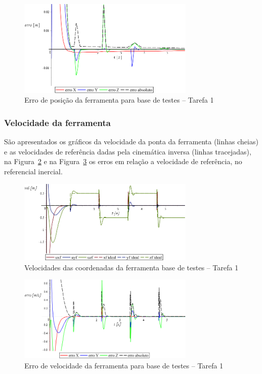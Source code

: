 \begin{figure}[h!]
	\centering 
 	\includegraphics[width=0.75\textwidth]{figs/t1_erroposf_base_testes}
 	\caption{Erro de posição da ferramenta para base de testes -- Tarefa 1}
 	\label{fig::t1_erroposf_base_testes}
\end{figure}



\subsubsection{Velocidade da ferramenta}

São apresentados os gráficos da velocidade da ponta da ferramenta (linhas
cheias) e as velocidades de referência dadas pela cinemática inversa (linhas
tracejadas), na Figura~\ref{fig::t1_velf_base_testes} e na
Figura~\ref{fig::t1_errovelf_base_testes} os erros em relação a velocidade de
referência, no referencial inercial.

\begin{figure}[h!]
	\centering 
 	\includegraphics[width=0.75\textwidth]{figs/t1_velf_base_testes}
 	\caption{Velocidades das coordenadas da ferramenta base de testes --
 	Tarefa 1}
 	\label{fig::t1_velf_base_testes}
\end{figure}

\begin{figure}[h!]
	\centering 
 	\includegraphics[width=0.75\textwidth]{figs/t1_errovelf_base_testes}
 	\caption{Erro de velocidade da ferramenta para base de testes --
 	Tarefa 1}
 	\label{fig::t1_errovelf_base_testes}
\end{figure}


